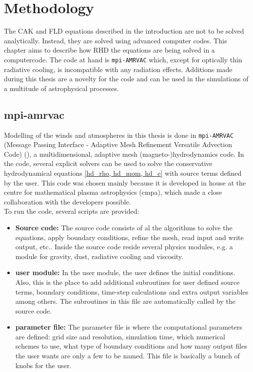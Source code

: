 \chapter{Methodology}
The CAK and FLD equations described in the introduction are not to be solved analytically. Instead, they are solved using advanced computer codes. This chapter aims to describe how RHD the equations are being solved in a computercode. The code at hand is \texttt{mpi-AMRVAC} which, except for optically thin radiative cooling, is incompatible with any radiation effects. Additions made during this thesis are a novelty for the code and can be used in the simulations of a multitude of astrophysical processes.

\section{mpi-amrvac} \label{section: methods amrvac}
Modelling of the winds and atmospheres in this thesis is done in \texttt{mpi-AMRVAC} (Message Passing Interface - Adaptive Mesh Refinement Versatile Advection Code) (\cite{Porth2014}), a multidimensional, adaptive mesh (magneto-)hydrodynamics code. In the code, several explicit solvers can be used to solve the conservative hydrodynamical equations \eqref{hd_rho, hd_mom, hd_e} with source terms defined by the user. This code was chosen mainly because it is developed in house at the centre for mathematical plasma astrophysics (cmpa), which made a close collaboration with the developers possible.\\
To run the code, several scripts are provided:

\begin{itemize}
\item \textbf{Source code:} The source code consists of al the algorithms to solve the equations, apply boundary conditions, refine the mesh, read input and write output, etc.. Inside the source code reside several physics modules, e.g. a module for gravity, dust, radiative cooling and viscosity.\\

\item \textbf{user module:} In the user module, the user defines the initial conditions. Also, this is the place to add additional subroutines for user defined source terms, boundary conditions, time-step calculations and extra output variables among others. The subroutines in this file are automatically called by the source code.\\

\item \textbf{parameter file:} The parameter file is where the computational parameters are defined: grid size and resolution, simulation time, which numerical schemes to use, what type of boundary conditions and how many output files the user wants are only a few to be named. This file is basically a bunch of knobs for the user.\\
\end{itemize}

